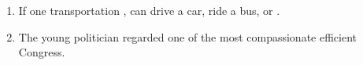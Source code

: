 \begin{enumerate}
\item \begin{inparaenum}[A]
If one  transportation ,  can drive a car, ride a bus, or . 
\end{inparaenum}

\item \begin{inparaenum}[A]
The young politician  regarded  one of the most compassionate  efficient  Congress. 
\end{inparaenum}


\end{enumerate}
